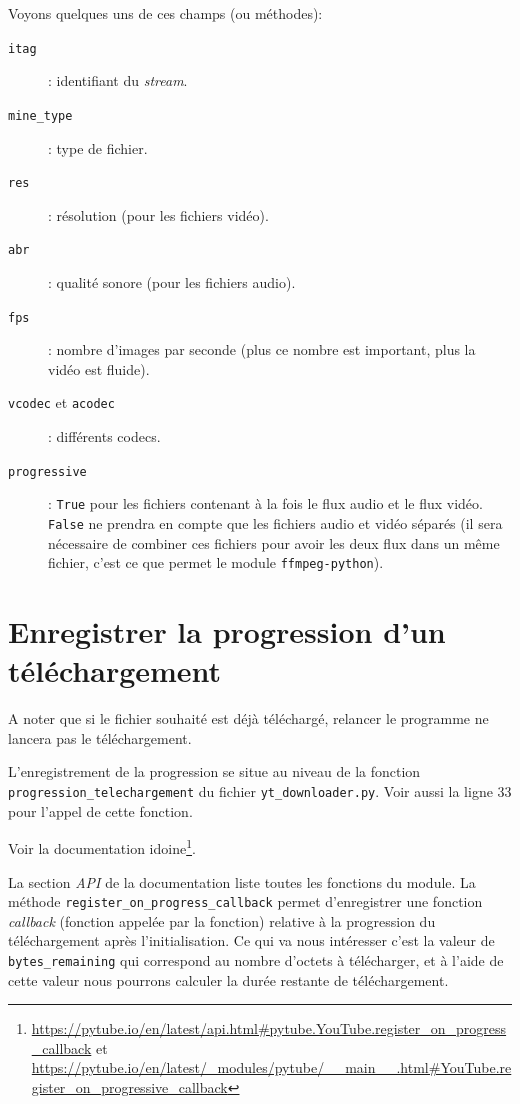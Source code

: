 \documentclass[a4paper,12pt]{book}
\begin{document}
Voyons quelques uns de ces champs (ou méthodes):
\begin{description}
	\item[\texttt{itag}]: identifiant du \textit{stream}.
	\item[\texttt{mine\_type}]: type de fichier.
	\item[\texttt{res}]: résolution (pour les fichiers vidéo).
	\item[\texttt{abr}]: qualité sonore (pour les fichiers audio).
	\item[\texttt{fps}]: nombre d'images par seconde (plus ce nombre est important, plus la vidéo est fluide).
	\item[\texttt{vcodec} et \texttt{acodec}]: différents codecs.
	\item[\texttt{progressive}]: \texttt{True} pour les fichiers contenant à la fois le flux audio et le flux vidéo. \texttt{False} ne prendra en compte que les fichiers audio et vidéo séparés (il sera nécessaire de combiner ces fichiers pour avoir les deux flux dans un même fichier, c'est ce que permet le module \texttt{ffmpeg-python}).
\end{description}
\medskip

\section{Enregistrer la progression d'un téléchargement}
A noter que si le fichier souhaité est déjà téléchargé, relancer le programme ne lancera pas le téléchargement.
\medskip

L'enregistrement de la progression se situe au niveau de la fonction \\ \texttt{progression\_telechargement} du fichier \texttt{yt\_downloader.py}. Voir aussi la ligne 33 pour l'appel de cette fonction.
\medskip

Voir la documentation idoine\footnote{\url{https://pytube.io/en/latest/api.html\#pytube.YouTube.register\_on\_progress\_callback} et \url{https://pytube.io/en/latest/\_modules/pytube/\_\_main\_\_.html\#YouTube.register\_on\_progressive\_callback}}.
\medskip

La section \textit{API} de la documentation liste toutes les fonctions du module. La méthode \texttt{register\_on\_progress\_callback} permet d'enregistrer une fonction \textit{callback} (fonction appelée par la fonction) relative à la progression du téléchargement après l'initialisation. Ce qui va nous intéresser c'est la valeur de \texttt{bytes\_remaining} qui correspond au nombre d'octets à télécharger, et à l'aide de cette valeur nous pourrons calculer la durée restante de téléchargement.
\medskip
\end{document}
